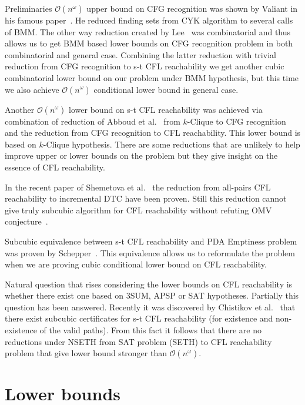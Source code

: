 \documentclass[12pt]{article}
\begin{document}
\begin{section}{Preliminaries}
	$\mathcal{O}(n^{\omega})$ upper bound on CFG recognition was shown by Valiant in his famous paper~\cite{valiant1975general}. He reduced finding sets from CYK algorithm to several calls of BMM. The other way reduction created by Lee~\cite{10.1145/505241.505242} was combinatorial and thus allows us to get BMM based lower bounds on CFG recognition problem in both combinatorial and general case.  Combining the latter reduction with trivial reduction from CFG recognition to s-t CFL reachability we get another cubic combinatorial lower bound on our problem under BMM hypothesis, but this time we also achieve $\mathcal{O}(n^{\omega})$ conditional lower bound in general case.
	
    Another $\mathcal{O}(n^{\omega})$ lower bound on s-t CFL reachability was achieved via combination of reduction of Abboud et al.~\cite{abboud2018if} from $k$-Clique to CFG recognition and the reduction from CFG recognition to CFL reachability. This lower bound is based on $k$-Clique hypothesis. There are some reductions that are unlikely to help improve upper or lower bounds on the problem but they give insight on the essence of CFL reachability. 
	
	In the recent paper of Shemetova et al.~\cite{shemetova2021algorithm} the reduction from all-pairs CFL reachability to incremental DTC have been proven. Still this reduction cannot give truly subcubic algorithm for CFL reachability without refuting OMV conjecture~\cite{8948597, 10.1145/2746539.2746609}.
	
	Subcubic equivalence between s-t CFL reachability and PDA Emptiness problem was proven by Schepper~\cite{schepper2018complexity}. This equivalence allows us to reformulate the problem when we are proving cubic conditional lower bound on CFL reachability.
	
	Natural question that rises considering the lower bounds on CFL reachability is whether there exist one based on 3SUM, APSP or SAT hypotheses. Partially this question has been answered. Recently it was discovered by Chistikov et al.~\cite{10.1145/3498702} that there exist subcubic certificates for s-t CFL reachability (for existence and non-existence of the valid paths). From this fact it follows that there are no reductions under NSETH from SAT problem (SETH) to CFL reachability problem that give lower bound stronger than $\mathcal{O}(n^{\omega})$.
	
\end{section}

\section{Lower bounds}
\label{sec:lower}
\end{document}
